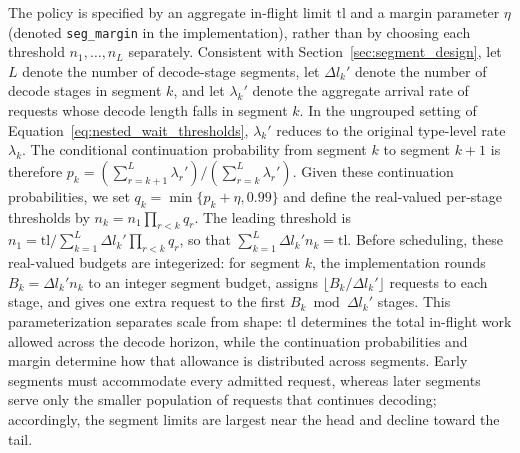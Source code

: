 The policy is specified by an aggregate in-flight limit $\mathrm{tl}$ and a margin parameter $\eta$ (denoted \texttt{seg\_margin} in the implementation), rather than by choosing each threshold $n_1,\dots,n_L$ separately. Consistent with Section~\ref{sec:segment_design}, let $L$ denote the number of decode-stage segments, let $\Delta l_k'$ denote the number of decode stages in segment $k$, and let $\lambda_k'$ denote the aggregate arrival rate of requests whose decode length falls in segment $k$. In the ungrouped setting of Equation~\eqref{eq:nested_wait_thresholds}, $\lambda_k'$ reduces to the original type-level rate $\lambda_k$. The conditional continuation probability from segment $k$ to segment $k{+}1$ is therefore $p_k=(\sum_{r=k+1}^L\lambda_r')/(\sum_{r=k}^L\lambda_r')$. Given these continuation probabilities, we set $q_k=\min\{p_k+\eta,0.99\}$ and define the real-valued per-stage thresholds by $n_k=n_1\prod_{r<k}q_r$. The leading threshold is $n_1=\mathrm{tl}/\sum_{k=1}^L \Delta l_k'\prod_{r<k}q_r$, so that $\sum_{k=1}^L \Delta l_k' n_k=\mathrm{tl}$. Before scheduling, these real-valued budgets are integerized: for segment $k$, the implementation rounds $B_k=\Delta l_k' n_k$ to an integer segment budget, assigns $\lfloor B_k/\Delta l_k'\rfloor$ requests to each stage, and gives one extra request to the first $B_k \bmod \Delta l_k'$ stages. This parameterization separates scale from shape: $\mathrm{tl}$ determines the total in-flight work allowed across the decode horizon, while the continuation probabilities and margin determine how that allowance is distributed across segments. Early segments must accommodate every admitted request, whereas later segments serve only the smaller population of requests that continues decoding; accordingly, the segment limits are largest near the head and decline toward the tail.

